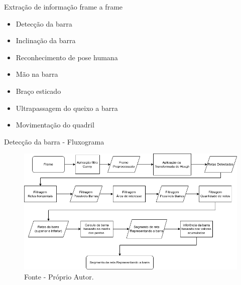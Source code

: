 

\begin{frame}{Extração de informação frame a frame}
    \begin{itemize}
        \item  Detecção da barra 
        \item  Inclinação da barra
        \item  Reconhecimento de pose humana 
        \item  Mão na barra 
        \item  Braço esticado
        \item  Ultrapassagem do queixo a barra
        \item  Movimentação do quadril
    \end{itemize}
\end{frame}








\begin{frame}{Detecção da barra - Fluxograma}
    \begin{figure}[!ht]
    \centering
    \includegraphics[scale=0.4]{img/desenvolvimento/detectaBarra/fluxograma.png}
    \caption*{Fonte - Próprio Autor.}
    \end{figure}
\end{frame}

